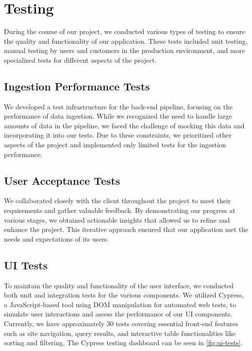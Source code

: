\section{Testing}

During the course of our project, we conducted various types of testing to ensure the quality and functionality of our application. These tests included unit testing, manual testing by users and customers in the production environment, and more specialized tests for different aspects of the project.

\subsection{Ingestion Performance Tests}

We developed a test infrastructure for the back-end pipeline, focusing on the performance of data ingestion. While we recognized the need to handle large amounts of data in the pipeline, we faced the challenge of mocking this data and incorporating it into our tests. Due to these constraints, we prioritized other aspects of the project and implemented only limited tests for the ingestion performance.

\subsection{User Acceptance Tests}

We collaborated closely with the client throughout the project to meet their requirements and gather valuable feedback. By demonstrating our progress at various stages, we obtained actionable insights that allowed us to refine and enhance the project. This iterative approach ensured that our application met the needs and expectations of its users.

\subsection{UI Tests}

To maintain the quality and functionality of the user interface, we conducted both unit and integration tests for the various components. We utilized Cypress, a JavaScript-based tool using DOM manipulation for automated web tests, to simulate user interactions and assess the performance of our UI components. Currently, we have approximately 30 tests covering essential front-end features such as site navigation, query results, and interactive table functionalities like sorting and filtering. The Cypress testing dashboard can be seen in \autoref{fig:ui-tests}.

